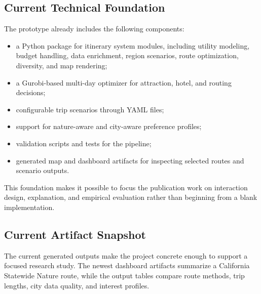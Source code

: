 \documentclass[11pt,a4paper]{article}
\begin{document}
\subsection*{Current Technical Foundation}

\noindent The prototype already includes the following components:

\begin{itemize}
    \item a Python package for itinerary system modules, including utility modeling, budget handling, data enrichment, region scenarios, route optimization, diversity, and map rendering;
    \item a Gurobi-based multi-day optimizer for attraction, hotel, and routing decisions;
    \item configurable trip scenarios through YAML files;
    \item support for nature-aware and city-aware preference profiles;
    \item validation scripts and tests for the pipeline;
    \item generated map and dashboard artifacts for inspecting selected routes and scenario outputs.
\end{itemize}

\noindent This foundation makes it possible to focus the publication work on interaction design, explanation, and empirical evaluation rather than beginning from a blank implementation.

\subsection*{Current Artifact Snapshot}

\noindent The current generated outputs make the project concrete enough to support a focused research study. The newest dashboard artifacts summarize a California Statewide Nature route, while the output tables compare route methods, trip lengths, city data quality, and interest profiles.
\end{document}
